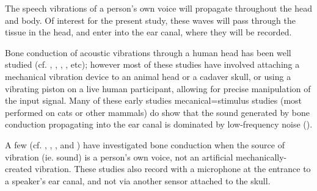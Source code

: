 
The speech vibrations of a person's own voice will propagate throughout the head and body.%
Of interest for the present study, these waves will pass through the tissue in the head, and enter into the ear canal, where they will be recorded. %

Bone conduction of acoustic vibrations through a human head has been well studied (cf. \cite{allen:60}, \cite{hakansson:94}, \cite{stenfelt:00}, \cite{reinfeldt:10}, etc); however most of these studies have involved attaching a mechanical vibration device to an animal head or a cadaver skull, or using a vibrating piston on a live human participant, allowing for precise manipulation of the input signal.  
Many of these early studies mecanical=stimulus studies (most performed on cats or other mammals) do show that the sound generated by bone conduction propagating into the ear canal is dominated by low-frequency noise (\cite{tonndorf:72}).

% 
%
A few (cf. \cite{bekesy:48}, \cite{hansen:97b}, \cite{porschmann:00}, and \cite{reinfeldt:10}) have investigated bone conduction when the source of vibration (ie. sound) is a person's own voice, not an artificial mechanically-created vibration.  These studies also record with a microphone at the entrance to a speaker's ear canal, and not via another sensor attached to the skull.

